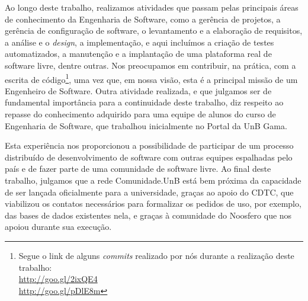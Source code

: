 \documentclass[12pt]{article}
\begin{document}
Ao longo deste trabalho, realizamos atividades que passam
pelas principais áreas de conhecimento da Engenharia de Software, como a
gerência de projetos, a gerência de configuração de software,
o levantamento e a elaboração de requisitos, a análise e o \textit{design},
a implementação, e aqui incluímos a criação de testes automatizados,
a manutenção e a implantação de uma plataforma real de software livre, dentre
outras.
%
Nos preocupamos em contribuir, na prática, com a escrita de código\footnote{%
Segue o link de alguns \textit{commits} realizado por nós durante a realização
deste trabalho: \\
\url{http://goo.gl/2ixQE4}\\
\url{http://goo.gl/pDlE8m}},
uma vez que, em nossa visão, esta é a principal missão de um Engenheiro de
Software.
%
Outra atividade realizada, e que julgamos ser de fundamental importância para a
continuidade deste trabalho, diz respeito ao repasse do conhecimento adquirido
para uma equipe de alunos do curso de Engenharia de Software, que trabalhou
inicialmente no Portal da UnB Gama.

Esta experiência nos proporcionou a possibilidade de participar de um processo
distribuído de desenvolvimento de software com outras equipes espalhadas pelo
país e de fazer parte de uma comunidade de software livre.
%
Ao final deste trabalho, julgamos que a rede Comunidade.UnB está bem próxima
da capacidade de ser lançada oficialmente para a universidade, graças ao
apoio do CDTC, que viabilizou os contatos necessários para formalizar os
pedidos de uso, por exemplo, das bases de dados existentes nela, e graças
à comunidade do Noosfero que nos apoiou durante sua execução.




\end{document}
